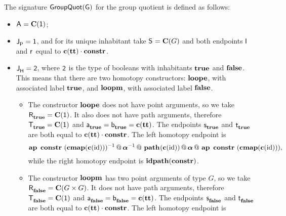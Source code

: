 The signature $\groupquot G$ for the group quotient is defined as follows:
\begin{itemize}
\item $\pointconstr = \constantP{\unit}$;
\item $\pathlabel = \unit$, and for its unique inhabitant take $\patharg = \constantP{G}$ and both endpoints $\pathleft$ and $\pathright$ equal to $\comp{\Ce(\unitt)}{\constr}$.
\item $\homotlabel = \bool$, where $\bool$ is the type of
booleans with inhabitants $\booltrue$ and $\boolfalse$. This means
that there are two homotopy constructors: $\groupquotloope$, with
associated label $\booltrue$, and $\groupquotloopm$, with associated
label $\boolfalse$.
\begin{itemize}
\item The constructor $\groupquotloope$ does not have
point arguments, so we take $\homotpointarg_{\booltrue}
= \constantP{\unit}$. It also does not have path arguments, therefore
$\homotpathtarg_{\booltrue} = \constantP{\unit}$ and
$\pathargleft_{\booltrue} = \pathargright_{\booltrue} = \Ce(\unitt)$.
The endpoints $\homotpathleft_{\booltrue}$ and
$\homotpathright_{\booltrue}$ are both equal to
$\comp{\Ce(\unitt)}{\constr}$. The left homotopy endpoint is
\[
\hconcat{\hap{\constr}{\hinv{(\hcompconst{\Ce(\id)})}}}{
\hconcat{\hinv{\hassocN}}{
\hconcat{\hconstr{}{\Ce(\id)}}{
\hconcat{\hassocN}{\hap{\constr}{(\hcompconst{\Ce(\id)})}}
}}},
\]
while the right homotopy endpoint is $\hrefl{\constr}$.
\item The constructor $\groupquotloopm$ has two point
arguments of type $G$, so we take $\homotpointarg_{\boolfalse}
= \constantP{G \times G}$. It does not have path arguments, therefore
$\homotpathtarg_{\boolfalse} = \constantP{\unit}$ and
$\pathargleft_{\boolfalse} = \pathargright_{\boolfalse}
= \Ce(\unitt)$.  The endpoints $\homotpathleft_{\boolfalse}$ and
$\homotpathright_{\boolfalse}$ are both equal to
$\comp{\Ce(\unitt)}{\constr}$. The left homotopy endpoint is

\end{itemize}
\end{itemize}
